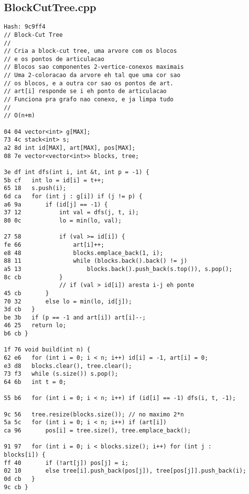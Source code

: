 \documentclass[11pt, a4paper, twoside]{article}
\begin{document}
\subsection{BlockCutTree.cpp}
\begin{lstlisting}
Hash: 9c9ff4
// Block-Cut Tree
//
// Cria a block-cut tree, uma arvore com os blocos
// e os pontos de articulacao
// Blocos sao componentes 2-vertice-conexos maximais
// Uma 2-coloracao da arvore eh tal que uma cor sao
// os blocos, e a outra cor sao os pontos de art.
// art[i] responde se i eh ponto de articulacao
// Funciona pra grafo nao conexo, e ja limpa tudo
//
// O(n+m)

04 04 vector<int> g[MAX];
73 4c stack<int> s;
a2 8d int id[MAX], art[MAX], pos[MAX];
08 7e vector<vector<int>> blocks, tree;

3e df int dfs(int i, int &t, int p = -1) {
5b cf 	int lo = id[i] = t++;
65 18 	s.push(i);
6d ca 	for (int j : g[i]) if (j != p) {
a6 9a 		if (id[j] == -1) {
37 12 			int val = dfs(j, t, i);
80 0c 			lo = min(lo, val);
      
27 58 			if (val >= id[i]) {
fe 66 				art[i]++;
e8 48 				blocks.emplace_back(1, i);
88 11 				while (blocks.back().back() != j)
a5 13 					blocks.back().push_back(s.top()), s.pop();
8c cb 			}
      			// if (val > id[i]) aresta i-j eh ponte
45 cb 		}
70 32 		else lo = min(lo, id[j]);
3d cb 	}
be 3b 	if (p == -1 and art[i]) art[i]--;
46 25 	return lo;
b6 cb }

1f 76 void build(int n) {
62 e6 	for (int i = 0; i < n; i++) id[i] = -1, art[i] = 0;
e3 d8 	blocks.clear(), tree.clear();
73 f3 	while (s.size()) s.pop();
64 6b 	int t = 0;
      
55 b6 	for (int i = 0; i < n; i++) if (id[i] == -1) dfs(i, t, -1);
      
9c 56 	tree.resize(blocks.size()); // no maximo 2*n
5a 5c 	for (int i = 0; i < n; i++) if (art[i])
ca 96 		pos[i] = tree.size(), tree.emplace_back();
      
91 97 	for (int i = 0; i < blocks.size(); i++) for (int j : blocks[i]) {
ff 40 		if (!art[j]) pos[j] = i;
02 10 		else tree[i].push_back(pos[j]), tree[pos[j]].push_back(i);
0d cb 	}
9c cb }
\end{lstlisting}
\end{document}
